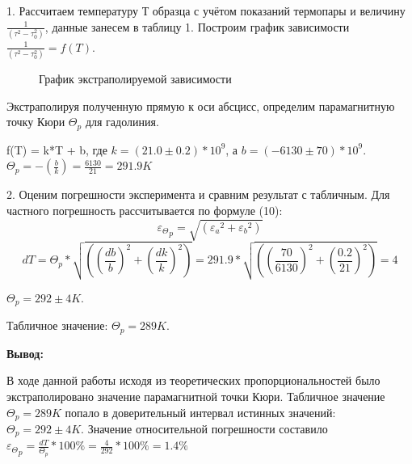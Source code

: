 \documentclass[a4paper,12pt]{article}
\begin{document}
\par 1. Рассчитаем температуру Т образца с учётом показаний термопары и величину $ \frac {1}{(\tau^2 - \tau_0^2)}$, данные занесем в таблицу 1. Построим график зависимости $ \frac {1}{(\tau^2 - \tau_0^2)} = f(T)$. 
\begin{figure}
	\centering
	\caption{ График экстраполируемой зависимости}
	\label{mah}
\end{figure}
Экстраполируя полученную прямую к оси абсцисс, определим парамагнитную точку Кюри $\Theta_p$ для гадолиния.

f(T) = k*T + b, где $k = (21.0 \pm 0.2)*10^9$, а $b = (-6130 \pm 70)*10^9$.
$\Theta_p = - \left (\frac{b}{k} \right) = \frac {6130}{21} = 291.9 K$
\par 2. Оценим погрешности эксперимента и сравним результат с табличным. Для частного погрешность рассчитывается по формуле (10):
\begin{equation}
{\varepsilon_\Theta}_p = \sqrt{\left({\varepsilon_a}^2+{\varepsilon_b}^2\right)} 
\end{equation}
\begin{equation}
	dT = \Theta_p*\sqrt{\left(\left(\frac{db}{b}\right)^2+\left(\frac{dk}{k}\right)^2\right)}  = 291.9*\sqrt{\left(\left(\frac{70}{6130}\right)^2+\left(\frac{0.2}{21}\right)^2\right)} = 4
\end{equation}
\par $\Theta_p = 292 \pm 4 K$.
\par Табличное значение: $\Theta_p = 289 K$.
\par \textbf{Вывод:}
\par В ходе данной работы исходя из теоретических пропорциональностей было экстраполировано значение парамагнитной точки Кюри. Табличное значение $\Theta_p = 289 K$ попало в доверительный интервал истинных значений: $\Theta_p = 292 \pm 4 K$. Значение относительной погрешности составило ${\varepsilon_\Theta}_p = \frac {dT}{\Theta_p} * 100\% = \frac {4}{292} * 100\% = 1.4\%$
\end{document}
